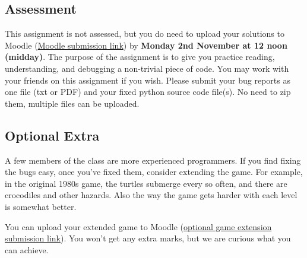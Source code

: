 \documentclass{article}
\begin{document}
\subsection*{Assessment}

This assignment is not assessed, but you do need to upload your solutions to Moodle (\href{https://moodle.ucl.ac.uk/mod/assign/view.php?id=9108708}{Moodle submission link}) by \textbf{Monday 2nd November at 12 noon (midday)}.  The purpose of the assignment is to
give you practice reading, understanding, and debugging a non-trivial
piece of code.  You may work with your friends on this assignment if
you wish.  Please submit your bug reports as one file (txt or PDF) and your fixed python source code file(s).  No need to zip them, multiple files can be uploaded.

\subsection*{Optional Extra}

A few members of the class are more experienced programmers.  If you
find fixing the bugs easy, once you've fixed them, consider extending
the game.  For example, in the original 1980s game, the turtles submerge
every so often, and there are crocodiles and other hazards.  Also the
way the game gets harder with each level is somewhat better.

You can upload your extended game to Moodle (\href{https://moodle.ucl.ac.uk/mod/assign/view.php?id=9108709}{optional game extension submission link}).  You won't get any extra marks, but we are
curious what you can achieve.
\end{document}
